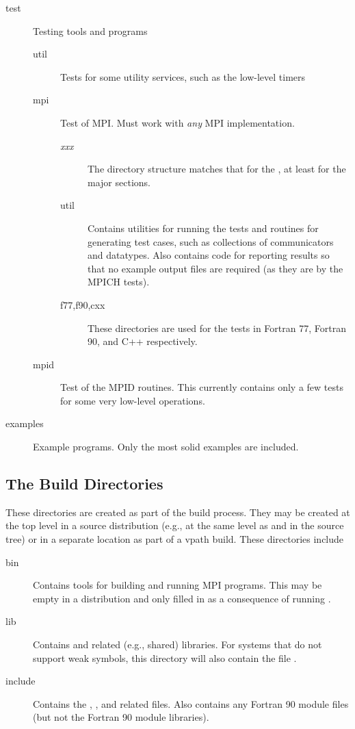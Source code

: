 \documentclass{article}
\begin{document}
\begin{description}
\item[test]Testing tools and programs
  \begin{description}
    \item[util]Tests for some utility services, such as the low-level timers
    \item[mpi]Test of MPI.  Must work with \emph{any} MPI implementation.
      \begin{description}
        \item[\emph{xxx}]The directory structure matches that for the
          , at least for the major sections.  
        \item[util]Contains utilities for running the tests and routines
for generating test cases, such as collections of communicators and
datatypes.  Also contains code for reporting results so that no
example output files are required (as they are by the MPICH tests).
        \item[f77,f90,cxx]These directories are used for the tests in 
	  Fortran 77, Fortran 90, and C++ respectively.
      \end{description}
    \item[mpid]Test of the MPID routines.  This currently contains
    only a few tests for some very low-level operations.
  \end{description}
\item[examples]Example programs.  Only the most solid examples are included.
\end{description}

\subsection{The Build Directories}
These directories are created as part of the build process.  They may
be created at the top level in a source distribution (e.g., at the
same level as  and  in the source tree) or in a
separate location as part of a vpath build.
These directories include
\begin{description}
\item[bin]Contains tools for building and running MPI programs.  This may be
  empty in a distribution and only filled in as a consequence of running
  .
\item[lib]Contains  and related (e.g., shared)
libraries.  For systems that do not support weak symbols, this
directory will also contain the file .
\item[include]Contains the , , and related
files.  Also contains any Fortran 90 module files (but not the Fortran
90 module libraries).
\end{description}
\end{document}
